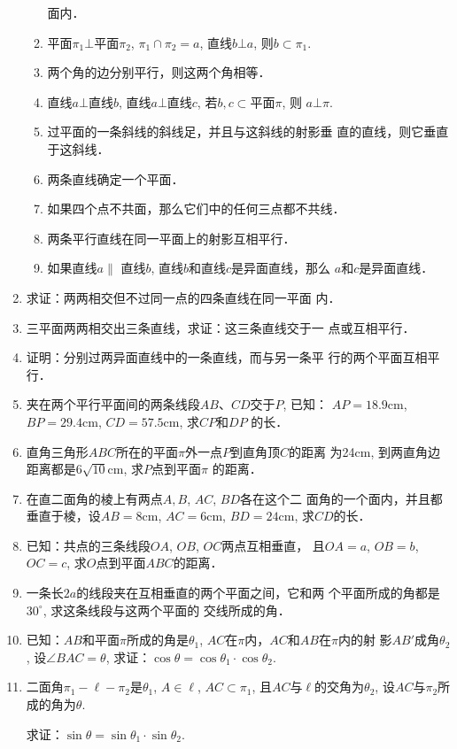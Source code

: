 \begin{enumerate}
\begin{enumerate}[(1)]
面内．
\item 平面$\pi_1\bot $平面$\pi_2$, $\pi_1\cap \pi_2=a$, 直线$b\bot a$, 则$b\subset \pi_1$.
\item 两个角的边分别平行，则这两个角相等．
\item 直线$a\bot $直线$b$, 直线$a\bot $直线$c$, 若$b,c\subset $平面$\pi$, 则
$a\bot \pi$.
\item 过平面的一条斜线的斜线足，并且与这斜线的射影垂
直的直线，则它垂直于这斜线．
\item 两条直线确定一个平面．
\item 如果四个点不共面，那么它们中的任何三点都不共线．
\item 两条平行直线在同一平面上的射影互相平行．
\item 如果直线$a\parallel$ 直线$b$, 直线$b$和直线$c$是异面直线，那么
$a$和$c$是异面直线．
\end{enumerate}

\item 求证：两两相交但不过同一点的四条直线在同一平面
内．
\item 三平面两两相交出三条直线，求证：这三条直线交于一
点或互相平行．
\item 证明：分别过两异面直线中的一条直线，而与另一条平
行的两个平面互相平行．
\item 夹在两个平行平面间的两条线段$AB$、$CD$交于$P$, 已知：
$AP=18.9$cm, $BP=29.4$cm, $CD=57.5$cm, 求$CP$和$DP$
的长．
\item 直角三角形$ABC$所在的平面$\pi$外一点$P$到直角顶$C$的距离
为24cm, 到两直角边距离都是$6\sqrt{10}$cm, 求$P$点到平面$\pi$
的距离．
\item 在直二面角的棱上有两点$A,B$, $AC$, $BD$各在这个二
面角的一个面内，并且都垂直于棱，设$AB=8$cm, $AC
=6$cm, $BD=24$cm, 求$CD$的长．
\item 已知：共点的三条线段$OA$, $OB$, $OC$两点互相垂直，
且$OA=a$, $OB=b$, $OC=c$, 求$O$点到平面$ABC$的距离．
\item 一条长$2a$的线段夹在互相垂直的两个平面之间，它和两
个平面所成的角都是$30^{\circ}$, 求这条线段与这两个平面的
交线所成的角．

\item 已知：$AB$和平面$\pi$所成的角是$\theta_1$, 
$AC$在$\pi$内，$AC$和$AB$在$\pi$内的射
影$AB'$成角$\theta_2$, 设$\angle BAC=\theta$, 
求证：$\cos\theta=\cos\theta_1\cdot \cos\theta_2$.
\item 二面角$\pi_1-\ell-\pi_2$是$\theta_1$, $A\in\ell$, 
$AC\subset \pi_1$, 且$AC$与$\ell$的交角为$\theta_2$, 
设$AC$与$\pi_2$所成的角为$\theta$.

求证：$\sin\theta=\sin\theta_1\cdot \sin\theta_2$.


\end{enumerate}

